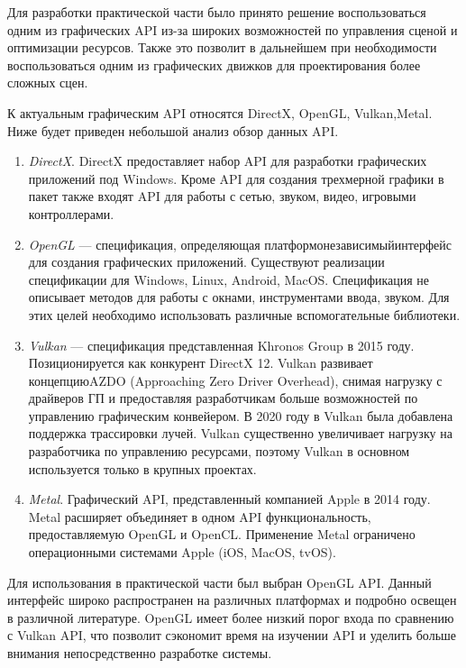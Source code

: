 Для разработки практической части было принято решение воспользоваться одним из
графических API из-за широких возможностей по управления сценой и оптимизации
ресурсов. Также это позволит в дальнейшем при необходимости воспользоваться
одним из графических движков для проектирования более сложных сцен.

К актуальным графическим API относятся DirectX, OpenGL, Vulkan,\break{}Metal. Ниже
будет приведен небольшой анализ обзор данных API\@.
\begin{enumerate}
    \item \emph{DirectX}. DirectX предоставляет набор API для разработки
        графических приложений под Windows. Кроме API для создания трехмерной
        графики в пакет также входят API для работы с сетью, звуком, видео,
        игровыми контроллерами.
    \item \emph{OpenGL} --- спецификация, определяющая
        платформонезависимый\break{}интерфейс для создания графических
        приложений. Существуют реализации спецификации для Windows, Linux,
        Android, MacOS\@. Спецификация не описывает методов для работы с окнами,
        инструментами ввода, звуком. Для этих целей необходимо использовать
        различные вспомогательные библиотеки.
    \item \emph{Vulkan} --- спецификация представленная Khronos Group в 2015 году.
        Позиционируется как конкурент DirectX 12. Vulkan развивает
        концепцию\break{}AZDO (Approaching Zero Driver Overhead), снимая
        нагрузку с драйверов ГП и предоставляя разработчикам больше возможностей
        по управлению графическим конвейером. В 2020 году в Vulkan была
        добавлена поддержка трассировки лучей. Vulkan существенно увеличивает
        нагрузку на разработчика по управлению ресурсами, поэтому Vulkan в
        основном используется только в крупных проектах.
    \item \emph{Metal}. Графический API, представленный компанией Apple в 2014
        году. Metal расширяет объединяет в одном API функциональность,
        предоставляемую OpenGL и OpenCL\@. Применение Metal ограничено
        операционными системами Apple (iOS, MacOS, tvOS).
\end{enumerate}

Для использования в практической части был выбран OpenGL API\@. Данный интерфейс
широко распространен на различных платформах и подробно освещен в различной
литературе. OpenGL имеет более низкий порог входа по сравнению с Vulkan API, что
позволит сэкономит время на изучении API и уделить больше внимания
непосредственно разработке системы.

